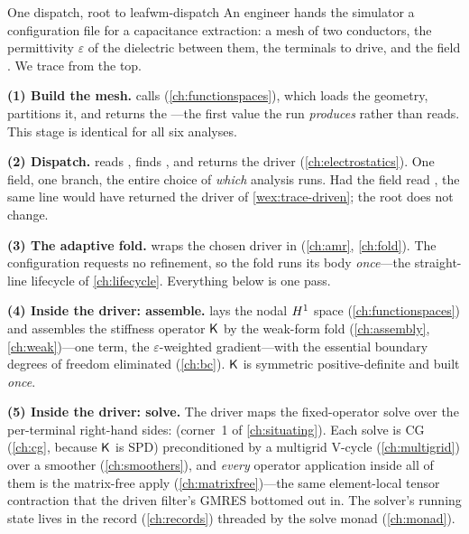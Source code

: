 \begin{workedexample}{One dispatch, root to leaf}{wm-dispatch}
An engineer hands the simulator a configuration file for a capacitance extraction: a
mesh of two conductors, the permittivity $\varepsilon$ of the dielectric between them,
the terminals to drive, and the field . We trace
 from the top.

\medskip
\textbf{(1) Build the mesh.}  calls 
(\cref{ch:functionspaces}), which loads the geometry, partitions it, and returns the
---the first value the run \emph{produces} rather than reads. This stage is
identical for all six analyses.

\textbf{(2) Dispatch.}  reads , finds
, and  returns the  driver
(\cref{ch:electrostatics}). One field, one branch, the entire choice of \emph{which}
analysis runs. Had the field read , the same line would have returned the
 driver of \cref{wex:trace-driven}; the root does not change.

\textbf{(3) The adaptive fold.}  wraps the chosen driver in
 (\cref{ch:amr}, \cref{ch:fold}). The configuration requests no
refinement, so the fold runs its body \emph{once}---the straight-line lifecycle of
\cref{ch:lifecycle}. Everything below is one pass.

\textbf{(4) Inside the driver: assemble.}  lays the nodal
$H^1$ space (\cref{ch:functionspaces}) and assembles the stiffness operator $\mathsf{K}$
by the weak-form fold  (\cref{ch:assembly}, \cref{ch:weak})---one
term, the $\varepsilon$-weighted gradient---with the essential boundary degrees of
freedom eliminated (\cref{ch:bc}). $\mathsf{K}$ is symmetric positive-definite and built
\emph{once}.

\textbf{(5) Inside the driver: solve.} The driver maps the fixed-operator solve over
the per-terminal right-hand sides:  (corner~1 of
\cref{ch:situating}). Each solve is CG (\cref{ch:cg}, because $\mathsf{K}$ is SPD)
preconditioned by a multigrid V-cycle (\cref{ch:multigrid}) over a smoother
(\cref{ch:smoothers}), and \emph{every} operator application inside all of them is the
matrix-free apply (\cref{ch:matrixfree})---the same element-local tensor contraction
that the driven filter's GMRES bottomed out in. The solver's running state lives in the
 record (\cref{ch:records}) threaded by the solve monad
(\cref{ch:monad}).


\end{workedexample}
